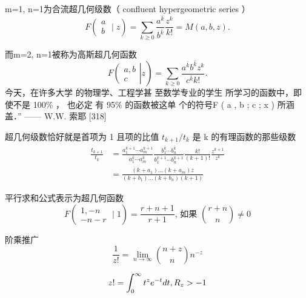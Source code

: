m=1, n=1为合流超几何级数（ confluent hypergeometric series ） 
\begin{equation}
    F\left(\begin{array}{l}
    a \\
    b
    \end{array} \mid z\right)=\sum_{k \geqslant 0} \frac{a^{\bar{k}}}{b^{\bar{k}}} \frac{z^{k}}{k !}=M(a, b, z) .
\end{equation}

而m=2, n=1被称为高斯超几何函数
\begin{equation}
    \left.F\left(\begin{array}{c}
    a, b \\
    c
    \end{array}\right| z\right)=\sum_{k \geqslant 0} \frac{a^{\bar{k}} b^{\bar{k}} z^{k}}{c^{\bar{k}} k !} .
\end{equation}
今天，在许多大学 的物理学、工程学甚 至数学专业的学生 所学习的函数中，即 使不是 100\% ， 也必定 有 95\% 的函数被这单 个的符号F ( a , b ; c ; x ) 所涵盖．”   —— W.W. 索耶 [318]

超几何级数恰好就是首项为 1 且项的比值 $t_{k+1} /t_{k}$ 是 k 的有理函数的那些级数
\begin{equation}
    \begin{aligned}
    \frac{t_{k+1}}{t_{k}} &=\frac{a_{1}^{\overline{k+1}} \cdots a_{m}^{\overline{k+1}}}{a_{1}^{\bar{k}} \cdots a_{m}^{\bar{k}}} \frac{b_{1}^{\bar{k}} \cdots b_{n}^{\bar{k}}}{b_{1}^{\overline{k+1}} \cdots b_{n}^{\overline{k+1}}} \frac{k !}{(k+1) !} \frac{z^{k+1}}{z^{k}} \\
    &=\frac{\left(k+a_{1}\right) \ldots\left(k+a_{m}\right) z}{\left(k+b_{1}\right) \ldots\left(k+b_{n}\right)(k+1)}
    \end{aligned}
\end{equation}

平行求和公式表示为超几何函数
\begin{equation}
    F\left(\begin{array}{c}
    1,-n \\
    -n-r
    \end{array} \mid 1\right)=\frac{r+n+1}{r+1} \text {, 如果 }{r+n \choose n} \neq 0
\end{equation}

阶乘推广
\begin{equation}
    \frac{1}{z!} = \lim_{n\rightarrow \infty} {n+z \choose n}n^{-z}
\end{equation}

\begin{equation}
    z! = \int_0^{\infty}t^ze^{-t}dt, R_z>-1
\end{equation}

